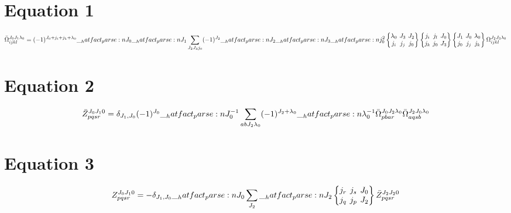 \documentclass{scrartcl}
\newcommand{\sixj}[6]{\begingroup\setlength{\arraycolsep}{0.2em}\begin{Bmatrix} #1 & #2 & #3 \\ #4 & #5 & #6 \end{Bmatrix}\endgroup}
\begin{document}
\section{Equation 1}
\begin{dmath*}
\bar{\Omega}_{i j k l}^{{J}_{0} {J}_{1} {{\lambda}}_{0}} = (-1)^{{J}_{0}+{j}_{i}+{j}_{k}+{{\lambda}}_{0}} \* \hatfact{{J}_{0}} \* \hatfact{{J}_{1}} \* \sum_{{J}_{2} {J}_{3} {j}_{0}} \* (-1)^{{J}_{2}} \* \hatfact{{J}_{2}} \* \hatfact{{J}_{3}} \* \hatfact{{j}_{0}^{2}} \* \sixj{{{\lambda}}_{0}}{{J}_{3}}{{J}_{2}}{{j}_{i}}{{j}_{j}}{{j}_{0}} \* \sixj{{j}_{i}}{{j}_{l}}{{J}_{0}}{{j}_{k}}{{j}_{0}}{{J}_{3}} \* \sixj{{J}_{1}}{{J}_{0}}{{{\lambda}}_{0}}{{j}_{0}}{{j}_{j}}{{j}_{k}} \* \Omega_{i j k l}^{{J}_{2} {J}_{3} {{\lambda}}_{0}}
\end{dmath*}

\section{Equation 2}
\begin{dmath*}
\bar{Z}_{p q s r}^{{J}_{0} {J}_{1} 0} = \delta_{{J}_{1},{J}_{0}} \* (-1)^{{J}_{0}} \* \hatfact{{J}_{0}^{-1}} \* \sum_{a b {J}_{2} {{\lambda}}_{0}} \* (-1)^{{J}_{2}+{{\lambda}}_{0}} \* \hatfact{{{\lambda}}_{0}^{-1}} \* \bar{\Omega}_{p b a r}^{{J}_{0} {J}_{2} {{\lambda}}_{0}} \* \bar{\Omega}_{a q s b}^{{J}_{2} {J}_{0} {{\lambda}}_{0}}
\end{dmath*}

\section{Equation 3}
\begin{dmath*}
Z_{p q s r}^{{J}_{0} {J}_{1} 0} = -\delta_{{J}_{1},{J}_{0}} \* \hatfact{{J}_{0}} \* \sum_{{J}_{2}} \* \hatfact{{J}_{2}} \* \sixj{{j}_{r}}{{j}_{s}}{{J}_{0}}{{j}_{q}}{{j}_{p}}{{J}_{2}} \* \bar{Z}_{p q s r}^{{J}_{2} {J}_{2} 0}
\end{dmath*}
\end{document}
